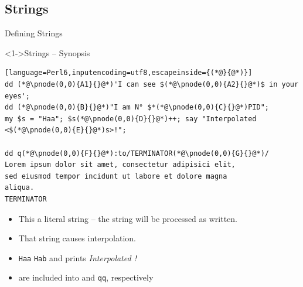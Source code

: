 \subsection{Strings}

\begin{frame}[fragile]{Defining Strings}
\begin{block}<1->{Strings -- Synopsis}
\small
\begin{lstlisting}[language=Perl6,inputencoding=utf8,escapeinside={(*@}{@*)}]
dd (*@\pnode(0,0){A1}{}@*)'I can see $(*@\pnode(0,0){A2}{}@*)$ in your eyes';
dd (*@\pnode(0,0){B}{}@*)"I am N° $*(*@\pnode(0,0){C}{}@*)PID";
my $s = "Haa"; $s(*@\pnode(0,0){D}{}@*)++; say "Interpolated <$(*@\pnode(0,0){E}{}@*)s>!";

dd q(*@\pnode(0,0){F}{}@*):to/TERMINATOR(*@\pnode(0,0){G}{}@*)/
Lorem ipsum dolor sit amet, consectetur adipisici elit,
sed eiusmod tempor incidunt ut labore et dolore magna
aliqua.
TERMINATOR
\end{lstlisting}
\end{block}

\begin{itemize}
\item<2-> This  a literal string -- the string will be processed  as written.
\item<3-> That string  causes interpolation. 
\item<5->   \texttt{Haa} \textrightarrow{}  \texttt{Hab} and prints \textit{Interpolated  !}
\item<6->  are included into \texttt{} and \texttt{qq}, respectively
\end{itemize}
\end{frame}

